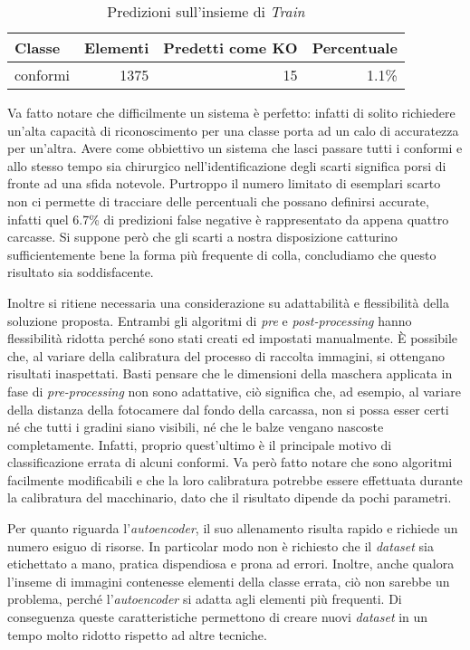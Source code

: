 \begin{table}[ht]
  \centering
  \begin{tabular}{||l r r r||}
    \hline
    Classe           & Elementi & Predetti come KO & Percentuale \\ \hline \hline
    conformi         & 1375     & 15               & 1.1\%       \\ \hline

  \end{tabular}
  \caption{Predizioni sull'insieme di \textit{Train}}
  \label{tab:train_predicions}
\end{table}


Va fatto notare che difficilmente un sistema è perfetto: infatti di solito richiedere un'alta capacità di riconoscimento per una classe porta ad un calo di accuratezza per un'altra.
Avere come obbiettivo un sistema che lasci passare tutti i conformi e allo stesso tempo sia chirurgico nell'identificazione degli scarti significa porsi di fronte ad una sfida notevole.
Purtroppo il numero limitato di esemplari scarto non ci permette di tracciare delle percentuali che possano definirsi accurate, infatti quel 6.7\% di predizioni false negative è rappresentato da appena quattro carcasse.
Si suppone però che gli scarti a nostra disposizione catturino sufficientemente bene la forma più frequente di colla, concludiamo che questo risultato sia soddisfacente.

Inoltre si ritiene necessaria una considerazione su adattabilità e flessibilità della soluzione proposta.
Entrambi gli algoritmi di \textit{pre} e \textit{post-processing} hanno flessibilità ridotta perché sono stati creati ed impostati manualmente.
È possibile che, al variare della calibratura del processo di raccolta immagini, si ottengano risultati inaspettati.
Basti pensare che le dimensioni della maschera applicata in fase di \textit{pre-processing} non sono adattative, ciò significa che, ad esempio, al variare della distanza della fotocamere dal fondo della carcassa, non si possa esser certi né che tutti i gradini siano visibili, né che le balze vengano nascoste completamente.
Infatti, proprio quest'ultimo è il principale motivo di classificazione errata di alcuni conformi.
Va però fatto notare che sono algoritmi facilmente modificabili e che la loro calibratura potrebbe essere effettuata durante la calibratura del macchinario, dato che il risultato dipende da pochi parametri.

Per quanto riguarda l'\textit{autoencoder}, il suo allenamento risulta rapido e richiede un numero esiguo di risorse.
In particolar modo non è richiesto che il \textit{dataset} sia etichettato a mano, pratica dispendiosa e prona ad errori.
Inoltre, anche qualora l'inseme di immagini contenesse elementi della classe errata, ciò non sarebbe un problema, perché l'\textit{autoencoder} si adatta agli elementi più frequenti.
Di conseguenza queste caratteristiche permettono di creare nuovi \textit{dataset} in un tempo molto ridotto rispetto ad altre tecniche.

